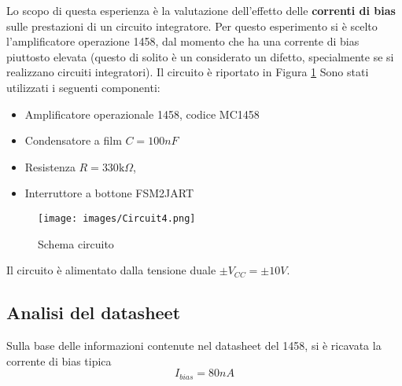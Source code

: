 Lo scopo di questa esperienza è la valutazione dell'effetto delle \textbf{correnti di bias} sulle prestazioni di un circuito integratore. Per questo esperimento si è  scelto l’amplificatore operazione 1458, dal momento che ha una corrente di bias piuttosto elevata (questo di solito è un considerato un difetto, specialmente se si realizzano circuiti integratori). Il circuito è riportato in Figura \ref{fig:Circuit4}
Sono stati utilizzati i seguenti componenti:
\begin{itemize}
    \item Amplificatore operazionale 1458, codice MC1458
    \item Condensatore a film $C=100nF$
    \item Resistenza $R=330\text{k}\Omega$, 
    \item Interruttore a bottone FSM2JART
\end{itemize}
\begin{figure}[H]
    \centering
    \texttt{[image: images/Circuit4.png]}
    \caption{Schema circuito}
    \label{fig:Circuit4}
\end{figure}
Il circuito è alimentato dalla tensione duale $\pm V_{CC}=\pm 10V$.
\subsection{Analisi del datasheet}
Sulla base delle informazioni contenute nel datasheet del 1458, si è ricavata la corrente di bias tipica
\begin{equation*}
    I_{bias}=80nA
\end{equation*}
\clearpage
